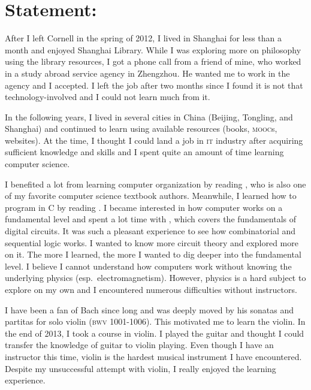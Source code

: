 


\usepackage[font={scriptsize,it}]{caption}
\usepackage{metalogo,alltt,soul,tikz,standalone,wrapfig,csquotes}
\usetikzlibrary{calc}
\usepackage{biblatex}



\newcommand*{\TikZ}{PGF/\kern1bpTi\kern.5bp\textit{k}Z}


	\onum
	
	\section*{Statement:}
	After I left Cornell in the spring of 2012, I lived in Shanghai for less
	than a month and enjoyed Shanghai Library. While I was exploring more on
	philosophy using the library resources, I got a phone call from a friend of
	mine, who worked in a study abroad service agency in Zhengzhou. He wanted me to
	work in the agency and I accepted. I left the job after two months since I
	found it is not that technology-involved and I could not learn much from it.
	
	In the following years, I lived in several cities in China (Beijing, Tongling,
	and Shanghai) and continued to learn using available resources (books,
	\textsc{mooc}s, websites). At the time, I thought I could land a job in
	\textsc{it} industry after acquiring sufficient knowledge and skills and I
	spent quite an amount of time learning computer science.
	
	I benefited a lot from learning computer organization by reading
	\textcite{COA8e}, who is also one of my favorite computer science textbook
	authors. Meanwhile, I learned how to program in C by reading \textcite{K&R}. I
	became interested in how computer works on a fundamental level and spent a lot
	time with \textcite{LCDF}, which covers the fundamentals of digital circuits.
	It was such a pleasant experience to see how combinatorial and sequential logic
	works. I wanted to know more circuit theory and explored more on it. The more I
	learned, the more I wanted to dig deeper into the fundamental level. I believe
	I cannot understand how computers work without knowing the underlying physics
	(esp.~electromagnetism). However, physics is a hard subject to explore on my
	own and I encountered numerous difficulties without instructors.
	
	I have been a fan of Bach since long and was deeply moved by his sonatas and
	partitas for solo violin (\textsc{bwv} 1001-1006). This motivated me to
	learn the violin. In the end of 2013, I took a course in violin. I
	played the guitar and thought I could transfer the knowledge of guitar to
	violin playing. Even though I have an instructor this time, violin is the
	hardest musical instrument I have encountered. Despite my unsuccessful attempt
	with violin, I really enjoyed the learning experience.
	
